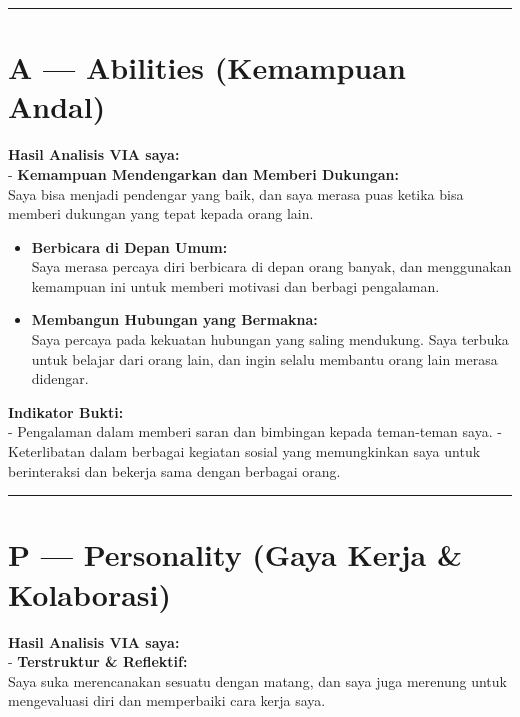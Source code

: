 \documentclass[
  letterpaper,
  DIV=11,
  numbers=noendperiod]{scrreprt}
\begin{document}
\begin{center}\rule{0.5\linewidth}{0.5pt}\end{center}

\section{A --- Abilities (Kemampuan
Andal)}\label{a-abilities-kemampuan-andal}

\textbf{Hasil Analisis VIA saya:}\\
- \textbf{Kemampuan Mendengarkan dan Memberi Dukungan:}\\
Saya bisa menjadi pendengar yang baik, dan saya merasa puas ketika bisa
memberi dukungan yang tepat kepada orang lain.

\begin{itemize}
\item
  \textbf{Berbicara di Depan Umum:}\\
  Saya merasa percaya diri berbicara di depan orang banyak, dan
  menggunakan kemampuan ini untuk memberi motivasi dan berbagi
  pengalaman.
\item
  \textbf{Membangun Hubungan yang Bermakna:}\\
  Saya percaya pada kekuatan hubungan yang saling mendukung. Saya
  terbuka untuk belajar dari orang lain, dan ingin selalu membantu orang
  lain merasa didengar.
\end{itemize}

\textbf{Indikator Bukti:}\\
- Pengalaman dalam memberi saran dan bimbingan kepada teman-teman saya.
- Keterlibatan dalam berbagai kegiatan sosial yang memungkinkan saya
untuk berinteraksi dan bekerja sama dengan berbagai orang.

\begin{center}\rule{0.5\linewidth}{0.5pt}\end{center}

\section{P --- Personality (Gaya Kerja \&
Kolaborasi)}\label{p-personality-gaya-kerja-kolaborasi}

\textbf{Hasil Analisis VIA saya:}\\
- \textbf{Terstruktur \& Reflektif:}\\
Saya suka merencanakan sesuatu dengan matang, dan saya juga merenung
untuk mengevaluasi diri dan memperbaiki cara kerja saya.
\end{document}
